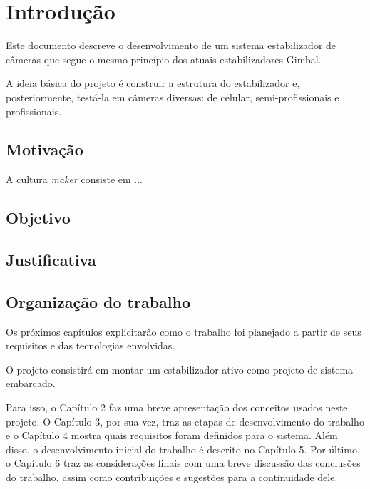 \chapter{Introdução}\label{CAP:introducao}

Este documento descreve o desenvolvimento de um sistema estabilizador de câmeras que segue o mesmo princípio dos atuais estabilizadores Gimbal.

A ideia básica do projeto é construir a estrutura do estabilizador e, posteriormente, testá-la em câmeras diversas: de celular, semi-profissionais e profissionais.

\section{Motivação}
A cultura \textit{maker} consiste em ...\textsuperscript{\cite{cultura_maker}}

 
\section{Objetivo}




\section{Justificativa}


\section{Organização do trabalho}
Os próximos capítulos explicitarão como o trabalho foi planejado a partir de seus requisitos e das tecnologias envolvidas.

O projeto consistirá em montar um estabilizador ativo como projeto de sistema embarcado.

Para isso, o Capítulo 2 faz uma breve apresentação dos conceitos usados neste projeto. O Capítulo 3, por sua vez, traz as etapas de desenvolvimento do trabalho e o Capítulo 4 mostra quais requisitos foram definidos para o sistema. Além disso, o desenvolvimento inicial do trabalho é descrito no Capítulo 5. Por último, o Capítulo 6 traz as considerações finais com uma breve discussão das conclusões do trabalho, assim como contribuições e sugestões para a continuidade dele.
